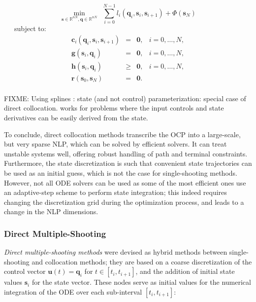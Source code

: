 \begin{equation}
  \min_{\mathbf{s}\in\mathbb R^{nN},\mathbf{q}\in\mathbb R^{nN}} \ \ \sum_{i=0}^{N-1}l_i(\mathbf{q}_i,\mathbf{s}_i,\mathbf{s}_{i+1}) + \Phi(\mathbf{s}_N)
\end{equation}
\ \ \ subject to:
\begin{equation}
  \begin{array}{rclr}
    \mathbf{c}_i(\mathbf{q}_i,\mathbf{s}_i,\mathbf{s}_{i+1}) & = & \mathbf{0}, & i=0,\ldots,N,%
    \\
    \mathbf{g}(\mathbf{s}_i,\mathbf{q}_i) & = & \mathbf{0}, & i=0,\ldots,N,%
    \\%
    \mathbf{h}(\mathbf{s}_i,\mathbf{q}_i) & \ge & \mathbf{0}, & i=0,\ldots,N,%
    \\%
    \mathbf{r} (\mathbf{s}_0, \mathbf{s}_N) & = & \mathbf{0}.%
    \\%
  \end{array}
\end{equation} 

FIXME: Using splines : state (and not control) parameterization:
special case of direct collocation. works for problems where the input
controls and state derivatives can be easily derived from the
state. \cite{sirinesa1981}

To conclude, direct collocation methods transcribe the OCP into a
large-scale, but very sparse NLP, which can be solved by efficient
solvers. It can treat unstable systems well, offering robust handling
of path and terminal constraints. Furthermore, the state
discretization is such that convenient state trajectories can be used
as an initial guess, which is not the case for single-shooting
methods. However, not all ODE solvers can be used as some of the most
efficient ones use an adaptive-step scheme to perform state
integration; this indeed requires changing the discretization grid
during the optimization process, and leads to a change in the NLP
dimensions.

\subsubsection{Direct Multiple-Shooting}
\label{subsubsec:chap3-direct-multiple-shooting}

\emph{Direct multiple-shooting methods} \cite{Bock1984} were devised
as hybrid methods between single-shooting and collocation methods;
they are based on a coarse discretization of the control vector
$\mathbf{u}(t)=\mathbf{q}_i$ for $t\in\left[t_i,t_{i+1}\right]$, and
the addition of initial state values $\mathbf{s}_i$ for the state
vector. These nodes serve as initial values for the numerical
integration of the ODE over each sub-interval $[t_i,t_{i+1}]$:

